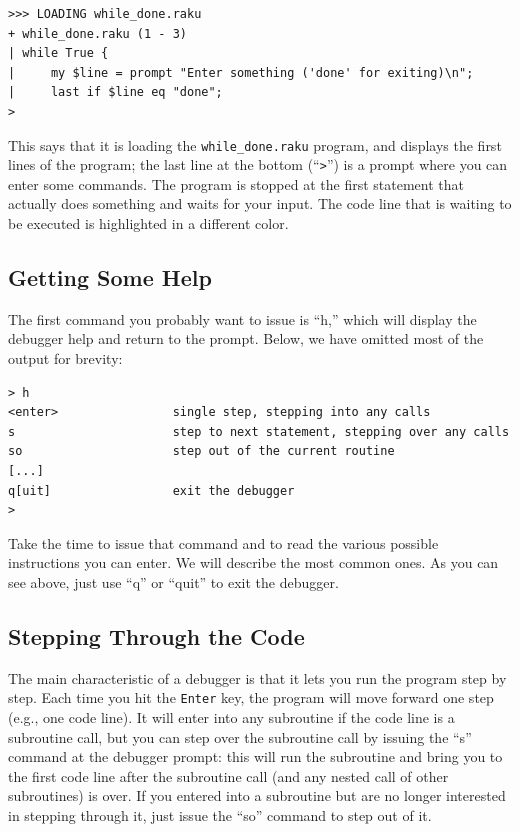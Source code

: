 \begin{verbatim}
>>> LOADING while_done.raku
+ while_done.raku (1 - 3)
| while True {
|     my $line = prompt "Enter something ('done' for exiting)\n";
|     last if $line eq "done";
>
\end{verbatim}

This says that it is loading the \verb'while_done.raku' program, 
and displays the first lines of the program; the last line at 
the bottom (``\verb">"'') is a prompt where you can enter some 
commands. The program 
is stopped at the first statement that actually does something 
and waits for your input. The code line that is waiting to be 
executed is highlighted in a different color.

\subsection{Getting Some Help}

The first command you probably want to issue is ``h,'' which 
will display the debugger help and return to the prompt. 
Below, we have omitted most of the output for brevity:

\begin{verbatim}
> h
<enter>                single step, stepping into any calls
s                      step to next statement, stepping over any calls
so                     step out of the current routine
[...]
q[uit]                 exit the debugger
>
\end{verbatim}

Take the time to issue that command and to read the 
various possible instructions you can enter. We will 
describe the most common ones. As you can see 
above, just use ``q'' or ``quit'' to exit the debugger.

\subsection{Stepping Through the Code}


The main characteristic of a debugger is that it 
lets you run the program step 
by step. Each time you hit the {\tt Enter} key, the 
program will move forward one step (e.g., one code line). 
It will enter into any subroutine if the code line 
is a subroutine call, but you can step over the 
subroutine call by issuing the ``s'' 
command at the debugger prompt: this will run the subroutine 
and bring you to the first code line after the subroutine 
call (and any nested call of other subroutines) is over.
If you entered into a subroutine but are no longer 
interested in stepping through it, just issue the ``so'' 
command to step out of it.

